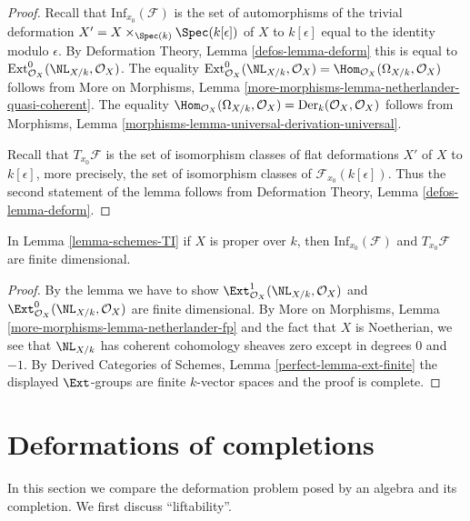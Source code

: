 \begin{proof}
Recall that $\text{Inf}_{x_0}(\mathcal{F})$ is the set of
automorphisms of the trivial deformation
$X' = X \times_{\Spec(k)} \Spec(k[\epsilon])$ of $X$ to $k[\epsilon]$
equal to the identity modulo $\epsilon$.
By Deformation Theory, Lemma \ref{defos-lemma-deform}
this is equal to $\text{Ext}^0_{\mathcal{O}_X}(\NL_{X/k}, \mathcal{O}_X)$.
The equality $\text{Ext}^0_{\mathcal{O}_X}(\NL_{X/k}, \mathcal{O}_X) =
\Hom_{\mathcal{O}_X}(\Omega_{X/k}, \mathcal{O}_X)$ follows from
More on Morphisms, Lemma
\ref{more-morphisms-lemma-netherlander-quasi-coherent}.
The equality
$\Hom_{\mathcal{O}_X}(\Omega_{X/k}, \mathcal{O}_X) =
\text{Der}_k(\mathcal{O}_X, \mathcal{O}_X)$
follows from Morphisms, Lemma
\ref{morphisms-lemma-universal-derivation-universal}.

\medskip\noindent
Recall that $T_{x_0}\mathcal{F}$ is the set of isomorphism classes
of flat deformations $X'$ of $X$ to $k[\epsilon]$, more precisely,
the set of isomorphism classes of $\mathcal{F}_{x_0}(k[\epsilon])$.
Thus the second statement of the lemma follows from
Deformation Theory, Lemma \ref{defos-lemma-deform}.
\end{proof}

\begin{lemma}
\label{lemma-proper-schemes-TI}
In Lemma \ref{lemma-schemes-TI} if $X$ is proper over $k$, then
$\text{Inf}_{x_0}(\mathcal{F})$ and $T_{x_0}\mathcal{F}$ are
finite dimensional.
\end{lemma}

\begin{proof}
By the lemma we have to show
$\Ext^1_{\mathcal{O}_X}(\NL_{X/k}, \mathcal{O}_X)$ and
$\Ext^0_{\mathcal{O}_X}(\NL_{X/k}, \mathcal{O}_X)$ are finite
dimensional. By More on Morphisms, Lemma
\ref{more-morphisms-lemma-netherlander-fp}
and the fact that $X$ is Noetherian, we see that
$\NL_{X/k}$ has coherent cohomology sheaves zero except
in degrees $0$ and $-1$.
By Derived Categories of Schemes, Lemma \ref{perfect-lemma-ext-finite}
the displayed $\Ext$-groups are finite $k$-vector spaces
and the proof is complete.
\end{proof}






\section{Deformations of completions}
\label{section-compare}

\noindent
In this section we compare the deformation problem posed
by an algebra and its completion.
We first discuss ``liftability''.

